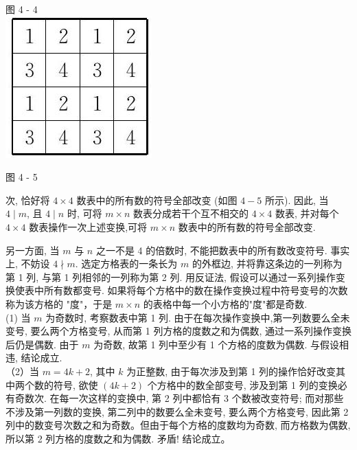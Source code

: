 \documentclass[10pt]{article}
\begin{document}
图 4 - 4\\
\includegraphics[max width=\textwidth, center]{2024_10_09_bce9f07034ef55fc9c97g-45(1)}

图 4 - 5

次, 恰好将 $4 \times 4$ 数表中的所有数的符号全部改变 (如图 $4-5$ 所示). 因此, 当 $4 \mid m$, 且 $4 \mid n$ 时, 可将 $m \times n$ 数表分成若干个互不相交的 $4 \times 4$ 数表, 并对每个 $4 \times 4$ 数表操作一次上述变换,可将 $m \times n$ 数表中的所有数的符号全部改变.

另一方面, 当 $m$ 与 $n$ 之一不是 4 的倍数时, 不能把数表中的所有数改变符号. 事实上, 不妨设 $4 \nmid m$. 选定方格表的一条长为 $m$ 的外框边, 并将靠这条边的一列称为第 1 列, 与第 1 列相邻的一列称为第 2 列. 用反证法, 假设可以通过一系列操作变换使表中所有数都变号. 如果将每个方格中的数在操作变换过程中符号变号的次数称为该方格的 "度"，于是 $m \times n$ 的表格中每一个小方格的"度"都是奇数.\\
(1) 当 $m$ 为奇数时, 考察数表中第 1 列. 由于在每次操作变换中,第一列数要么全未变号, 要么两个方格变号, 从而第 1 列方格的度数之和为偶数, 通过一系列操作变换后仍是偶数. 由于 $m$ 为奇数, 故第 1 列中至少有 1 个方格的度数为偶数. 与假设相违, 结论成立.\\
（2）当 $m=4 k+2$, 其中 $k$ 为正整数, 由于每次涉及到第 1 列的操作恰好改变其中两个数的符号, 欲使 $(4 k+2)$ 个方格中的数全部变号, 涉及到第 1 列的变换必有奇数次. 在每一次这样的变换中, 第 2 列中都恰有 3 个数被改变符号; 而对那些不涉及第一列数的变换, 第二列中的数要么全未变号, 要么两个方格变号, 因此第 2 列中的数变号次数之和为奇数。但由于每个方格的度数均为奇数, 而方格数为偶数, 所以第 2 列方格的度数之和为偶数. 矛盾! 结论成立。
\end{document}
